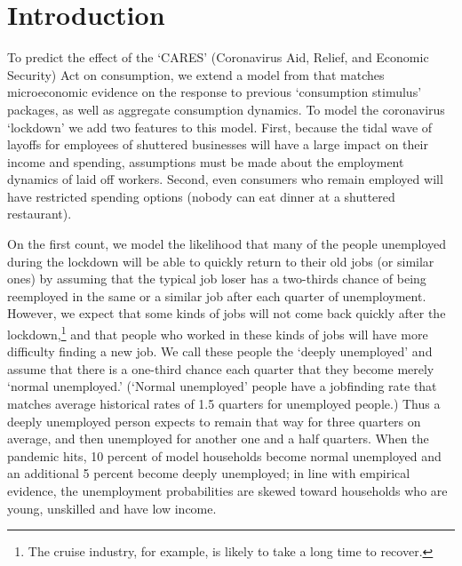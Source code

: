 \section{Introduction}

To predict the effect of the `CARES' (Coronavirus Aid, Relief, and Economic Security) Act on consumption, we extend a model from \cite{carroll_sticky_2020} that matches microeconomic evidence on the response to previous `consumption stimulus' packages, as well as aggregate consumption dynamics.
To model the coronavirus `lockdown' we add two features to this model. First, because the tidal wave of layoffs for employees of shuttered businesses will have a large impact on their income and spending, assumptions must be made about the employment dynamics of laid off workers.
Second, even consumers who remain employed will have restricted spending options (nobody can eat dinner at a shuttered restaurant).

On the first count, we model the likelihood that many of the people unemployed during the lockdown will be able to quickly return to their old jobs (or similar ones) by assuming that the typical job loser has a two-thirds chance of being reemployed in the same or a similar job after each quarter of unemployment.
However, we expect that some kinds of jobs will not come back quickly after the lockdown,\footnote{The cruise industry, for example, is likely to take a long time to recover.} and that people who worked in these kinds of jobs will have more difficulty finding a new job.
We call these people the `deeply unemployed' and assume that there is a one-third chance each quarter that they become merely `normal unemployed.'  (`Normal unemployed' people have a jobfinding rate that matches average historical rates of 1.5 quarters for unemployed people.)
Thus a deeply unemployed person expects to remain that way for three quarters on average, and then unemployed for another one and a half quarters.
When the pandemic hits, 10 percent of model households become normal unemployed and an additional 5 percent become deeply unemployed; in line with empirical evidence, the unemployment probabilities are skewed toward households who are young, unskilled and have low income.

